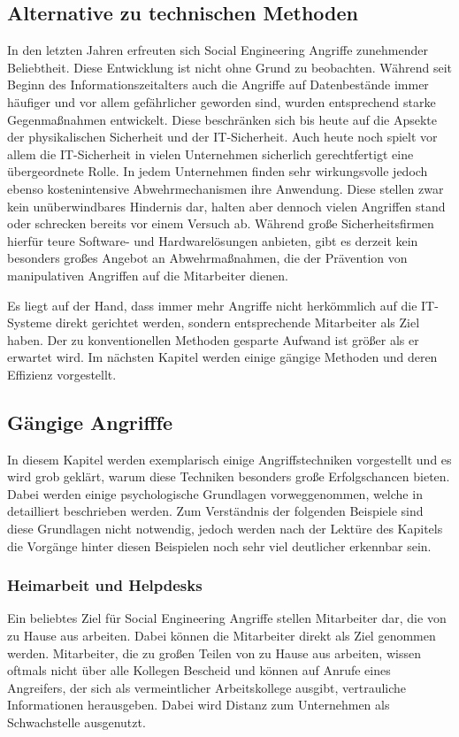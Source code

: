 \subsection{Alternative zu technischen Methoden}\label{sec:alternative_zu_technischen_methoden}
In den letzten Jahren erfreuten sich Social Engineering Angriffe zunehmender Beliebtheit.
Diese Entwicklung ist nicht ohne Grund zu beobachten.
Während seit Beginn des Informationszeitalters auch die Angriffe auf Datenbestände immer häufiger und
vor allem gefährlicher geworden sind, wurden entsprechend starke Gegenmaßnahmen entwickelt.
Diese beschränken sich bis heute auf die Apsekte der physikalischen Sicherheit und der IT-Sicherheit.
Auch heute noch spielt vor allem die IT-Sicherheit in vielen Unternehmen sicherlich gerechtfertigt
eine übergeordnete Rolle.
In jedem Unternehmen finden sehr wirkungsvolle jedoch ebenso kostenintensive Abwehrmechanismen ihre Anwendung.
Diese stellen zwar kein unüberwindbares Hindernis dar, halten aber dennoch vielen Angriffen stand oder
schrecken bereits vor einem Versuch ab.
Während große Sicherheitsfirmen hierfür teure Software- und Hardwarelösungen anbieten, gibt es derzeit
kein besonders großes Angebot an Abwehrmaßnahmen, die der Prävention von manipulativen Angriffen auf
die Mitarbeiter dienen. \cite{hacking-the-human}

Es liegt auf der Hand, dass immer mehr Angriffe nicht herkömmlich auf die IT-Systeme direkt
gerichtet werden, sondern entsprechende Mitarbeiter als Ziel haben.
Der zu konventionellen Methoden gesparte Aufwand ist größer als er erwartet wird.
Im nächsten Kapitel werden einige gängige Methoden und deren Effizienz vorgestellt.

\subsection{Gängige Angrifffe}\label{sec:gangige_angriffe}
In diesem Kapitel werden exemplarisch einige Angriffstechniken vorgestellt und es wird grob geklärt,
warum diese Techniken besonders große Erfolgschancen bieten.
Dabei werden einige psychologische Grundlagen vorweggenommen, welche in  detailliert
beschrieben werden.
Zum Verständnis der folgenden Beispiele sind diese Grundlagen nicht notwendig, jedoch werden nach der
Lektüre des Kapitels  die Vorgänge hinter diesen Beispielen noch sehr viel
deutlicher erkennbar sein.

\subsubsection{Heimarbeit und Helpdesks}\label{heimarbeitundhelpdesks}
Ein beliebtes Ziel für Social Engineering Angriffe stellen Mitarbeiter dar, die von zu Hause aus
arbeiten.
Dabei können die Mitarbeiter direkt als Ziel genommen werden. Mitarbeiter, die zu großen Teilen von zu
Hause aus arbeiten, wissen oftmals nicht über alle Kollegen Bescheid und können auf Anrufe eines
Angreifers, der sich als vermeintlicher Arbeitskollege ausgibt, vertrauliche Informationen
herausgeben. Dabei wird Distanz zum Unternehmen als Schwachstelle ausgenutzt.

